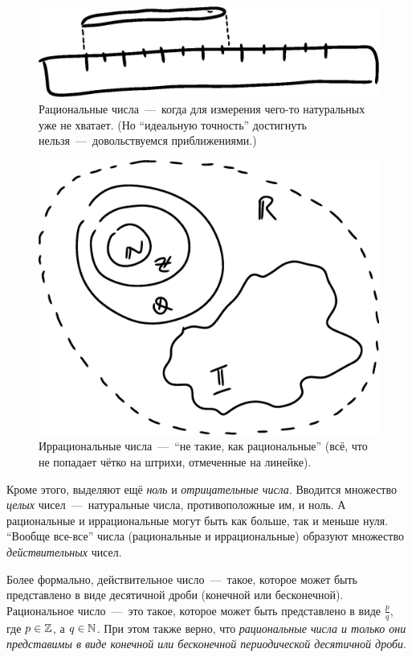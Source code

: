\documentclass[a4paper,12pt]{article}
\begin{document}
  \begin{figure}[ht]
    \centering
    \includegraphics[width=0.6\linewidth]{images/Length}
    
    \caption{
      Рациональные числа~---~когда для измерения чего-то натуральных уже не хватает.
      (Но ``идеальную точность'' достигнуть нельзя~---~довольствуемся приближениями.)
    }
    \label{fig:rationals}
  \end{figure}
  
  \begin{figure}[ht]
    \centering
    \includegraphics[width=0.6\linewidth]{images/Numbers}
    
    \caption{
      Иррациональные числа~---~``не такие, как рациональные'' (всё, что не попадает чётко на штрихи, отмеченные на линейке).
    }
    \label{fig:irrationals}
  \end{figure}
  
  Кроме этого, выделяют ещё \emph{ноль} и \emph{отрицательные числа}.
  Вводится множество \emph{целых} чисел~---~натуральные числа, противоположные им, и ноль.
  А рациональные и иррациональные могут быть как больше, так и меньше нуля.
  ``Вообще все-все'' числа (рациональные и иррациональные) образуют множество \emph{действительных} чисел.
  
  Более формально, действительное число~---~такое, которое может быть представлено в виде десятичной дроби (конечной или бесконечной).
  Рациональное число~---~это такое, которое может быть представлено в виде $\frac{p}{q}$, где $p \hm\in \ZZ$, а $q \hm\in \NN$.
  При этом также верно, что \emph{рациональные числа и только они представимы в виде конечной или бесконечной периодической десятичной дроби}.
  
\end{document}
